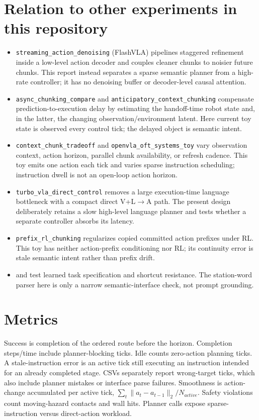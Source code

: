 \documentclass[11pt]{article}
\begin{document}
\section{Relation to other experiments in this repository}
\begin{itemize}[leftmargin=1.5em]
\item \texttt{streaming\_action\_denoising} (FlashVLA) pipelines staggered refinement inside a low-level action decoder and couples cleaner chunks to noisier future chunks. This report instead separates a sparse semantic planner from a high-rate controller; it has no denoising buffer or decoder-level causal attention.
\item \texttt{async\_chunking\_compare} and \texttt{anticipatory\_context\_chunking} compensate prediction-to-execution delay by estimating the handoff-time robot state and, in the latter, the changing observation/environment latent. Here current toy state is observed every control tick; the delayed object is semantic intent.
\item \texttt{context\_chunk\_tradeoff} and \texttt{openvla\_oft\_systems\_toy} vary observation context, action horizon, parallel chunk availability, or refresh cadence. This toy emits one action each tick and varies sparse instruction scheduling; instruction dwell is not an open-loop action horizon.
\item \texttt{turbo\_vla\_direct\_control} removes a large execution-time language bottleneck with a compact direct V+L$\rightarrow$A path. The present design deliberately retains a slow high-level language planner and tests whether a separate controller absorbs its latency.
\item \texttt{prefix\_rl\_chunking} regularizes copied committed action prefixes under RL. This toy has neither action-prefix conditioning nor RL; its continuity error is stale semantic intent rather than prefix drift.
\item {} and  test learned task specification and shortcut resistance. The station-word parser here is only a narrow semantic-interface check, not prompt grounding.
\end{itemize}

\section{Metrics}
Success is completion of the ordered route before the horizon. Completion steps/time include planner-blocking ticks. Idle counts zero-action planning ticks. A stale-instruction error is an active tick still executing an instruction intended for an already completed stage. CSVs separately report wrong-target ticks, which also include planner mistakes or interface parse failures. Smoothness is action-change accumulated per active tick, $\sum_t\lVert a_t-a_{t-1}\rVert_2/N_{active}$. Safety violations count moving-hazard contacts and wall hits. Planner calls expose sparse-instruction versus direct-action workload.
\end{document}

